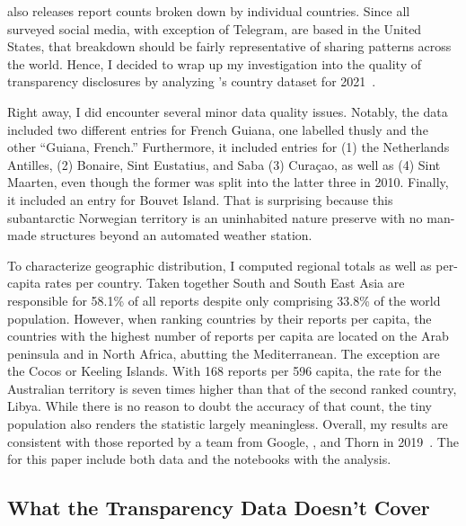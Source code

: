  also releases report counts broken down by individual countries. Since
all surveyed social media, with exception of Telegram, are based in the United
States, that breakdown should be fairly representative of  sharing
patterns across the world. Hence, I decided to wrap up my investigation into the
quality of transparency disclosures by analyzing 's country dataset for
2021~\cite{NcmecByCountry2021}.

Right away, I did encounter several minor data quality issues. Notably, the data
included two different entries for French Guiana, one labelled thusly and the
other ``Guiana, French.'' Furthermore, it included entries for (1) the
Netherlands Antilles, (2) Bonaire, Sint Eustatius, and Saba (3) Curaçao, as well
as (4) Sint Maarten, even though the former was split into the latter three in
2010. Finally, it included an entry for Bouvet Island. That is surprising
because this subantarctic Norwegian territory is an uninhabited nature preserve
with no man-made structures beyond an automated weather station.

To characterize geographic distribution, I computed regional totals as well as
per-capita rates per country. Taken together South and South East Asia are
responsible for 58.1\% of all reports despite only comprising 33.8\% of the
world population. However, when ranking countries by their reports per capita,
the countries with the highest number of reports per capita are located on the
Arab peninsula and in North Africa, abutting the Mediterranean. The exception are
the Cocos or Keeling Islands. With 168 reports per 596 capita, the rate for the
Australian territory is seven times higher than that of the second ranked
country, Libya. While there is no reason to doubt the accuracy of that count,
the tiny population also renders the statistic largely meaningless. Overall, my
results are consistent with those reported by a team from Google, , and
Thorn in 2019~\cite{BurszteinBrightea2019}. The
 for
this paper include both data and the notebooks with the analysis.


\subsection{What the Transparency Data Doesn't Cover}
\label{sec:census-limits}


